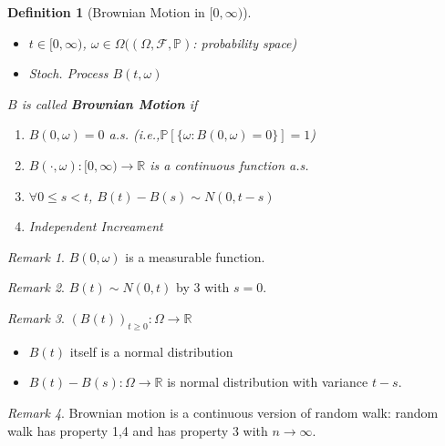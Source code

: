 \documentclass[12pt]{report}
\newcommand{\R}{\mathbb{R}}
\renewcommand{\P}{\mathbb{P}}
\newcommand{\F}{\mathcal{F}}
\renewcommand{\1}{\mathbb{1}}
\renewcommand{\O}{\Omega}
\theoremstyle{break}
\theoremstyle{newdef}
\newtheorem{defn}[thm]{Definition} %
\theoremstyle{remark}
\newtheorem*{rem}{Remark} %
\begin{document}
\begin{defn}[Brownian Motion in $[0,\infty)$]
\leavevmode
\vspace{-6mm}
\begin{itemize}
\item $t \in [0,\infty)$, $\omega \in \O((\O,\F,\P)$: probability space)
\item Stoch. Process $B(t,\omega)$
\end{itemize}
$B$ is called \textbf{Brownian Motion} if
\begin{enumerate}
\item $B(0,\omega) = 0$ a.s. (i.e.,$\P\left[\{\omega: B(0,\omega) = 0\}\right]=1$)
\item $B(\cdot, \omega) : [0,\infty) \rightarrow \R$ is a continuous function a.s.
\item $\forall 0 \leq s < t$, $B(t) - B(s) \sim N(0,t-s)$
\item Independent Increament
\end{enumerate}
\end{defn}

\begin{rem}
$B(0,\omega)$ is a measurable function.
\end{rem}

\begin{rem}
$B(t) \sim N(0,t)$ by 3 with $s=0$.
\end{rem}


\begin{rem}
$(B(t))_{t\geq 0} : \O \rightarrow \R$
\begin{itemize}
\item $B(t)$ itself is a normal distribution
\item $B(t) - B(s) : \O \rightarrow \R$ is normal distribution with variance $t-s$.
\end{itemize}
\end{rem}

\begin{rem}
Brownian motion is a continuous version of random walk: random walk has property 1,4 and has property 3 with $n\rightarrow\infty$.
\end{rem}
\end{document}
